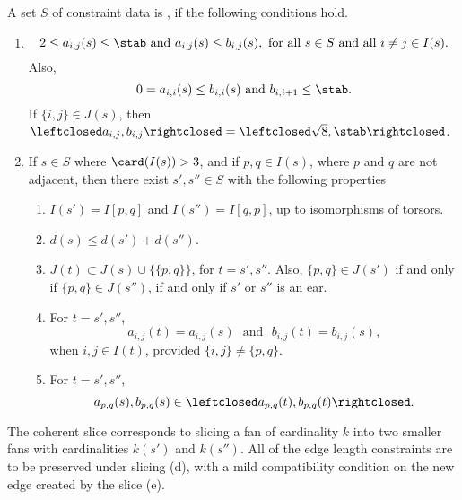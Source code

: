 \begin{definition}[coherence]
A set $S$ of constraint data is , if the following conditions
hold.
\begin{enumerate}
\item {} 
\[
2\le a_{i,j}(s)\le \stab \text{ and } a_{i,j}(s)\le
  b_{i,j}(s), \text{ for all } s\in S \text{ and all } i\ne j\in I(s).
\]  
  Also, 
\[0 = a_{i,i}(s)\le b_{i,i}(s) \text{ and }
  b_{i,i+1}\le \stab.
\]  
If $\{i,j\}\in J(s)$, then $\leftclosed
  a_{i,j},b_{i,j}\rightclosed=\leftclosed\sqrt{8},\stab\rightclosed$.
\item {}
  If $s\in S$ where $\card(I(s))>3$, and if  $p,q\in I(s)$, where
    $p$ and $q$ are not adjacent, then
 there exist $s',s''\in S$  %
with the following properties
\begin{enumerate}
\item  
 $I(s') = I[p,q]$ and $I(s'')=I[q,p]$, up to isomorphisms of torsors.
\item $d(s) \le d(s') + d(s'')$.
\item 
$J(t)\subset J(s)\cup \{\{p,q\}\}$, for  $t=s',s''$.
Also, $\{p,q\}\in J(s')$ if and only if $\{p,q\}\in J(s'')$,
 if and only if
 $s'$ or $s''$ is an ear.
\item For $t=s',s''$,
\[
a _{i,j}(t) = a_{i,j}(s)\text{~~and~~} b_{i,j}(t) = b_{i,j}(s),
\]
when $i,j\in I(t)$, provided $\{i,j\}\ne \{p,q\}$.
\item For $t=s',s''$,
\[
a_{p,q}(s),b_{p,q}(s) \in \leftclosed a_{p,q}(t),b_{p,q}(t)\rightclosed.
\]
\end{enumerate}
\end{enumerate}
\end{definition}

The coherent slice corresponds to slicing a fan of cardinality $k$ into
two smaller fans with cardinalities $k(s')$ and $k(s'')$.  All of the edge
length constraints are to be preserved under slicing (d), with a
mild compatibility condition on the new edge created by the slice (e).


